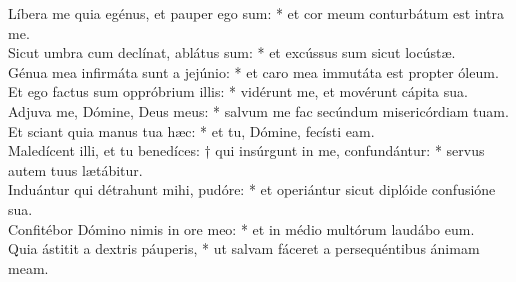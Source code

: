 {	Líbera me quia egénus, et pauper ego sum: * et cor meum conturbátum est intra me. \\
	Sicut umbra cum declínat, ablátus sum: * et excússus sum sicut locústæ. \\
	Génua mea infirmáta sunt a jejúnio: * et caro mea immutáta est propter óleum. \\
	Et ego factus sum oppróbrium illis: * vidérunt me, et movérunt cápita sua. \\
	Adjuva me, Dómine, Deus meus: * salvum me fac secúndum misericórdiam tuam. \\
	Et sciant quia manus tua hæc: * et tu, Dómine, fecísti eam. \\
	Maledícent illi, et tu benedíces: † qui insúrgunt in me, confundántur: * servus autem tuus lætábitur. \\
	Induántur qui détrahunt mihi, pudóre: * et operiántur sicut diplóide confusióne sua. \\
	Confitébor Dómino nimis in ore meo: * et in médio multórum laudábo eum. \\
	Quia ástitit a dextris páuperis, * ut salvam fáceret a persequéntibus ánimam meam. \\
}


